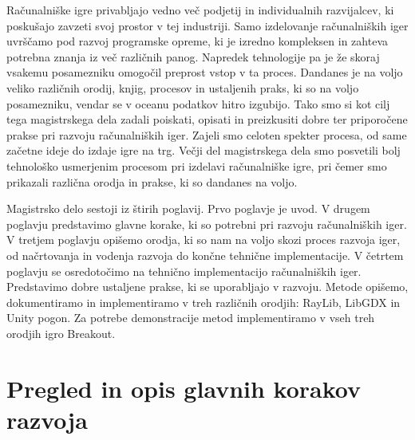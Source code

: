 \documentclass[12pt,a4paper,twoside]{book}
\begin{document}
Računalniške igre privabljajo vedno več podjetij in individualnih razvijalcev, ki poskušajo zavzeti svoj prostor v tej industriji. Samo izdelovanje računalniških iger uvrščamo pod razvoj programske opreme, ki je izredno kompleksen in zahteva potrebna znanja iz več različnih panog. Napredek tehnologije pa je že skoraj vsakemu posamezniku omogočil preprost vstop v ta proces. Dandanes je na voljo veliko različnih orodij, knjig, procesov in ustaljenih praks, ki so na voljo posamezniku, vendar se v oceanu podatkov hitro izgubijo. Tako smo si kot cilj tega magistrskega dela zadali poiskati, opisati in preizkusiti dobre ter priporočene prakse pri razvoju računalniških iger. Zajeli smo celoten spekter procesa, od same začetne ideje do izdaje igre na trg. Večji del magistrskega dela smo posvetili bolj tehnološko usmerjenim procesom pri izdelavi računalniške igre, pri čemer smo prikazali različna orodja in prakse, ki so dandanes na voljo.

Magistrsko delo sestoji iz štirih poglavij. Prvo poglavje je uvod. V drugem poglavju predstavimo glavne korake, ki so potrebni pri razvoju računalniških iger. V tretjem poglavju opišemo orodja, ki so nam na voljo skozi proces razvoja iger, od načrtovanja in vodenja razvoja do končne tehnične implementacije. V četrtem poglavju se osredotočimo na tehnično implementacijo računalniških iger. Predstavimo dobre ustaljene prakse, ki se uporabljajo v razvoju. Metode opišemo, dokumentiramo in implementiramo v treh različnih orodjih: RayLib, LibGDX in Unity pogon. Za potrebe demonstracije metod implementiramo v vseh treh orodjih igro Breakout.

\chapter{Pregled in opis glavnih korakov razvoja}\thispagestyle{fancy}
\end{document}
